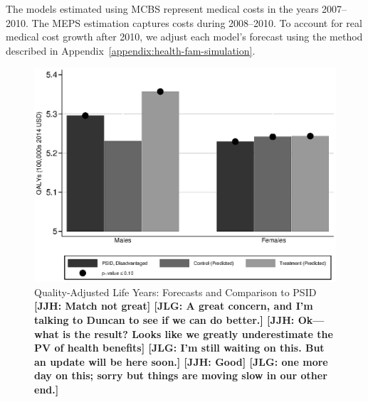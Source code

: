 The models estimated using MCBS represent medical costs in the years 2007--2010. The MEPS estimation captures costs during 2008--2010. To account for real medical cost growth after 2010, we adjust each model's forecast using the method described in  Appendix~\ref{appendix:health-fam-simulation}.

\begin{figure}[!htbp]
\caption{Quality-Adjusted Life Years: Forecasts and Comparison to PSID \textbf{[JJH: Match not great] [JLG: A great concern, and I'm talking to Duncan to see if we can do better.] [JJH: Ok---what is the result? Looks like we greatly underestimate the PV of health benefits] [JLG: I'm still waiting on this. But an update will be here soon.] [JJH: Good] [JLG: one more day on this; sorry but things are moving slow in our other end.]}}\label{fig:qalys}
\centering
\includegraphics[width=.7\columnwidth]{output/qalyexppsid.eps}
\end{figure}

